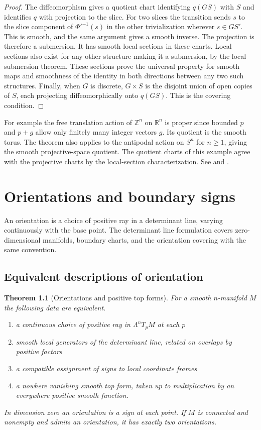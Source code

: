 \documentclass[11pt,oneside,openany]{book}
\newtheorem{theorem}{Theorem}[chapter]
\theoremstyle{definition}
\theoremstyle{remark}
\newcommand{\R}{\mathbb R}
\begin{document}
\begin{proof}
The diffeomorphism gives a quotient chart identifying \(q(GS)\) with \(S\) and identifies \(q\) with projection to the slice. For two slices the transition sends \(s\) to the slice component of \(\Phi'^{-1}(s)\) in the other trivialization wherever \(s\in GS'\). This is smooth, and the same argument gives a smooth inverse. The projection is therefore a submersion. It has smooth local sections in these charts. Local sections also exist for any other structure making it a submersion, by the local submersion theorem. These sections prove the universal property for smooth maps and smoothness of the identity in both directions between any two such structures. Finally, when \(G\) is discrete, \(G\times S\) is the disjoint union of open copies of \(S\), each projecting diffeomorphically onto \(q(GS)\). This is the covering condition.
\end{proof}

For example the free translation action of \(\mathbb Z^n\) on \(\R^n\) is proper since bounded \(p\) and \(p+g\) allow only finitely many integer vectors \(g\). Its quotient is the smooth torus. The theorem also applies to the antipodal action on \(S^n\) for \(n\geq1\), giving the smooth projective-space quotient. The quotient charts of this example agree with the projective charts by the local-section characterization. See \cite[Proposition 21.5 and Theorems 21.10 and 21.13]{lee} and \cite[Section 7]{tu}.
\chapter{Orientations and boundary signs}

An orientation is a choice of positive ray in a determinant line, varying continuously with the base point. The determinant line formulation covers zero-dimensional manifolds, boundary charts, and the orientation covering with the same convention.

\section{Equivalent descriptions of orientation}

\begin{theorem}[Orientations and positive top forms]
\label{p104:M09.01}
For a smooth \(n\)-manifold \(M\) the following data are equivalent.
\begin{enumerate}[label=\textup{(\alph*)}]
 \item a continuous choice of positive ray in \(\Lambda^nT_pM\) at each \(p\)
 \item smooth local generators of the determinant line, related on overlaps by positive factors
 \item a compatible assignment of signs to local coordinate frames
 \item a nowhere vanishing smooth top form, taken up to multiplication by an everywhere positive smooth function.
\end{enumerate}
In dimension zero an orientation is a sign at each point. If \(M\) is connected and nonempty and admits an orientation, it has exactly two orientations.
\end{theorem}
\end{document}
